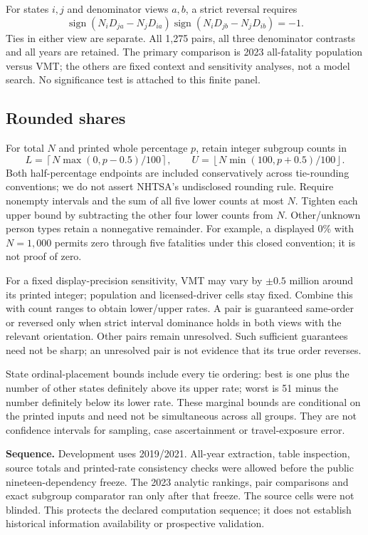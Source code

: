 \documentclass[10pt,letterpaper]{article}
\begin{document}
For states $i,j$ and denominator views $a,b$, a strict reversal requires
\[
\operatorname{sign}(N_iD_{ja}-N_jD_{ia})
\operatorname{sign}(N_iD_{jb}-N_jD_{ib})=-1.
\]
Ties in either view are separate. All 1,275 pairs, all three denominator contrasts and all years are retained. The primary comparison is 2023 all-fatality population versus VMT; the others are fixed context and sensitivity analyses, not a model search. No significance test is attached to this finite panel.

\subsection*{Rounded shares}
For total $N$ and printed whole percentage $p$, retain integer subgroup counts in
\[
L=\left\lceil N\max(0,p-0.5)/100\right\rceil,\qquad
U=\left\lfloor N\min(100,p+0.5)/100\right\rfloor.
\]
Both half-percentage endpoints are included conservatively across tie-rounding conventions; we do not assert NHTSA's undisclosed rounding rule. Require nonempty intervals and the sum of all five lower counts at most $N$. Tighten each upper bound by subtracting the other four lower counts from $N$. Other/unknown person types retain a nonnegative remainder. For example, a displayed 0\% with $N=1{,}000$ permits zero through five fatalities under this closed convention; it is not proof of zero.

For a fixed display-precision sensitivity, VMT may vary by $\pm0.5$ million around its printed integer; population and licensed-driver cells stay fixed. Combine this with count ranges to obtain lower/upper rates. A pair is guaranteed same-order or reversed only when strict interval dominance holds in both views with the relevant orientation. Other pairs remain unresolved. Such sufficient guarantees need not be sharp; an unresolved pair is not evidence that its true order reverses.

State ordinal-placement bounds include every tie ordering: best is one plus the number of other states definitely above its upper rate; worst is 51 minus the number definitely below its lower rate. These marginal bounds are conditional on the printed inputs and need not be simultaneous across all groups. They are not confidence intervals for sampling, case ascertainment or travel-exposure error.

\textbf{Sequence.} Development uses 2019/2021. All-year extraction, table inspection, source totals and printed-rate consistency checks were allowed before the public nineteen-dependency freeze. The 2023 analytic rankings, pair comparisons and exact subgroup comparator ran only after that freeze. The source cells were not blinded. This protects the declared computation sequence; it does not establish historical information availability or prospective validation.
\end{document}
